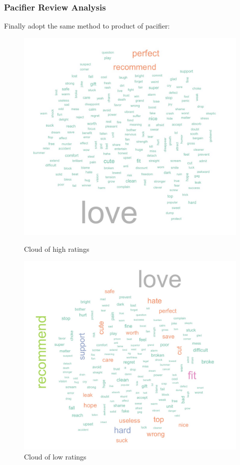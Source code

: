 \documentclass[12pt]{article}
\begin{document}
\subsubsection{Pacifier Review Analysis}
Finally adopt the same method to product of pacifier:
\begin{figure}[!htb]
   \begin{minipage}{0.48\textwidth}
     \centering
     \includegraphics[width=.8\linewidth]{paci45.jpeg}
     \caption{Cloud of high ratings}\label{Fig:4,5}
   \end{minipage}\hfill
   \begin{minipage}{0.48\textwidth}
     \centering
     \includegraphics[width=.8\linewidth]{paci12.jpeg}
     \caption{Cloud of low ratings}\label{Fig:1,2}
   \end{minipage}
\end{figure} 
\end{document}

